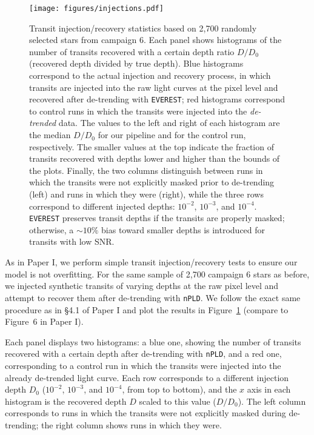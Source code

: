 \documentclass[]{emulateapj}
\begin{document}
\begin{figure}[hbt]
  \begin{center}
      \texttt{[image: figures/injections.pdf]}
       \caption{Transit injection/recovery statistics based on 2,700 randomly selected stars from campaign 6.
       Each panel shows histograms of the number of transits recovered with a certain depth
       ratio $D/D_0$ (recovered depth divided by true depth). Blue histograms correspond to the actual
       injection and recovery process, in which transits are injected into the raw light curves at the pixel level
       and recovered after de-trending with \texttt{EVEREST}; red histograms correspond to control runs in which the transits
       were injected into the \emph{de-trended} data. The values
       to the left and right of each histogram are the median $D/D_0$ for our pipeline and for the
       control run, respectively. The smaller values at the top indicate the fraction of transits recovered
       with depths lower and higher than the bounds of the plots. Finally, the two columns distinguish between
       runs in which the transits were not explicitly masked prior to de-trending (left) and runs in which they were (right),
       while the three rows correspond to different injected depths: $10^{−2}$, $10^{−3}$, and $10^{−4}$. \texttt{EVEREST}
       preserves transit depths if the transits are properly masked; otherwise, a ${\sim}10\%$ bias toward smaller depths is
       introduced for transits with low SNR.}
     \label{fig:injections}
  \end{center}
\end{figure}

As in Paper I, we perform simple transit injection/recovery tests to ensure
our model is not overfitting. For the same sample of 2,700 campaign 6 stars
as before, we injected synthetic transits of varying depths at the raw pixel level
and attempt to recover them after de-trending with \texttt{nPLD}. We follow
the exact same procedure as in \S4.1 of Paper I and plot the results in
Figure~\ref{fig:injections} (compare to Figure~6 in Paper I).

Each panel displays two histograms: a blue one, showing the number of
transits recovered with a certain depth after de-trending with \texttt{nPLD},
and a red one, corresponding to a control run in which the transits were injected
into the already de-trended light curve. Each row corresponds to a different
injection depth $D_0$ ($10^{-2}$, $10^{-3}$, and $10^{-4}$, from top to bottom), and the $x$ axis
in each histogram is the recovered depth $D$ scaled to this value ($D/D_0$). The
left column corresponds to runs in which the transits were not explicitly masked
during de-trending; the right column shows runs in which they were.
\end{document}
